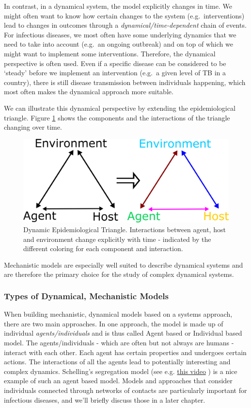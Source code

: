 \documentclass[]{article}
\theoremstyle{definition}
\theoremstyle{definition}
\theoremstyle{definition}
\theoremstyle{remark}
\begin{document}
In contrast, in a dynamical system, the model explicitly changes in
time. We might often want to know how certain changes to the system
(e.g.~interventions) lead to changes in outcomes through a
\emph{dynamical/time-dependent} chain of events. For infectious
diseases, we most often have some underlying dynamics that we need to
take into account (e.g.~an ongoing outbreak) and on top of which we
might want to implement some interventions. Therefore, the dynamical
perspective is often used. Even if a specific disease can be considered
to be `steady' before we implement an intervention (e.g.~a given level
of TB in a country), there is still disease transmission between
individuals happening, which most often makes the dynamical approach
more suitable.

We can illustrate this dynamical perspective by extending the
epidemiological triangle. Figure \ref{fig:dynamictriangle} shows the
components and the interactions of the triangle changing over time.

\begin{figure}
\centering
\includegraphics{./images/moving-triangle.png}
\caption{\label{fig:dynamictriangle}Dynamic Epidemiological Triangle.
Interactions between agent, host and environment change explicitly with
time - indicated by the different coloring for each component and
interaction.}
\end{figure}

Mechanistic models are especially well suited to describe dynamical
systems and are therefore the primary choice for the study of complex
dynamical systems.

\subsubsection{Types of Dynamical, Mechanistic
Models}\label{types-of-dynamical-mechanistic-models}

When building mechanistic, dynamical models based on a systems approach,
there are two main approaches. In one approach, the model is made up of
individual \emph{agents/individuals} and is thus called Agent based or
Individual based model. The agents/individuals - which are often but not
always are humans - interact with each other. Each agent has certain
properties and undergoes certain actions. The interactions of all the
agents lead to potentially interesting and complex dynamics. Schelling's
segregation model (see e.g. \href{https://youtu.be/dFl3Cfw12bo}{this
video} ) is a nice example of such an agent based model. Models and
approaches that consider individuals connected through networks of
contacts are particularly important for infectious diseases, and we'll
briefly discuss those in a later chapter.
\end{document}
